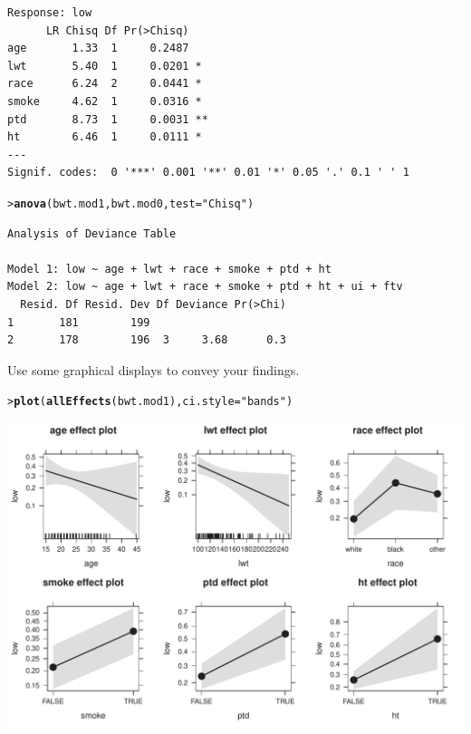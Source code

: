 \documentclass[10pt]{report}\usepackage[]{graphicx}\usepackage[]{color}
\makeatletter
\newcommand{\hlstr}[1]{\textcolor[rgb]{0.192,0.494,0.8}{#1}}%
\newcommand{\hlstd}[1]{\textcolor[rgb]{0.345,0.345,0.345}{#1}}%
\newcommand{\hlkwc}[1]{\textcolor[rgb]{0.333,0.667,0.333}{#1}}%
\newcommand{\hlkwd}[1]{\textcolor[rgb]{0.737,0.353,0.396}{\textbf{#1}}}%
\newenvironment{kframe}{%
 \def\at@end@of@kframe{}%
 \ifinner\ifhmode%
  \def\at@end@of@kframe{\end{minipage}}%
  \begin{minipage}{\columnwidth}%
 \fi\fi%
 \def\FrameCommand##1{\hskip\@totalleftmargin \hskip-\fboxsep
 \colorbox{shadecolor}{##1}\hskip-\fboxsep
     \hskip-\linewidth \hskip-\@totalleftmargin \hskip\columnwidth}%
 \MakeFramed {\advance\hsize-\width
   \@totalleftmargin\z@ \linewidth\hsize
   \@setminipage}}%
 {\par\unskip\endMakeFramed%
 \at@end@of@kframe}
\newenvironment{knitrout}{}{} %
\renewenvironment{knitrout}{\small\renewcommand{\baselinestretch}{.85}}{} %
\makeatother
\begin{document}
\begin{Exercises}
\begin{enumerate*}
\begin{ans}
\begin{knitrout}
\begin{kframe}
\begin{verbatim}
Response: low
      LR Chisq Df Pr(>Chisq)   
age       1.33  1     0.2487   
lwt       5.40  1     0.0201 * 
race      6.24  2     0.0441 * 
smoke     4.62  1     0.0316 * 
ptd       8.73  1     0.0031 **
ht        6.46  1     0.0111 * 
---
Signif. codes:  0 '***' 0.001 '**' 0.01 '*' 0.05 '.' 0.1 ' ' 1
\end{verbatim}
\begin{alltt}
\hlstd{> }\hlkwd{anova}\hlstd{(bwt.mod1, bwt.mod0,} \hlkwc{test}\hlstd{=}\hlstr{"Chisq"}\hlstd{)}
\end{alltt}
\begin{verbatim}
Analysis of Deviance Table

Model 1: low ~ age + lwt + race + smoke + ptd + ht
Model 2: low ~ age + lwt + race + smoke + ptd + ht + ui + ftv
  Resid. Df Resid. Dev Df Deviance Pr(>Chi)
1       181        199                     
2       178        196  3     3.68      0.3
\end{verbatim}
\end{kframe}
\end{knitrout}
    \end{ans}
    
    \item Use some graphical displays to convey your findings.
    \begin{ans}
\begin{knitrout}\footnotesize
{}\color{fgcolor}\begin{kframe}
\begin{alltt}
\hlstd{> }\hlkwd{plot}\hlstd{(}\hlkwd{allEffects}\hlstd{(bwt.mod1),} \hlkwc{ci.style}\hlstd{=}\hlstr{"bands"}\hlstd{)}
\end{alltt}
\end{kframe}

\centerline{\includegraphics[width=.7\textwidth]{soln/fig/ex7_6c-1} }




\end{knitrout}
\end{ans}
\end{enumerate*}
\end{Exercises}
\end{document}
